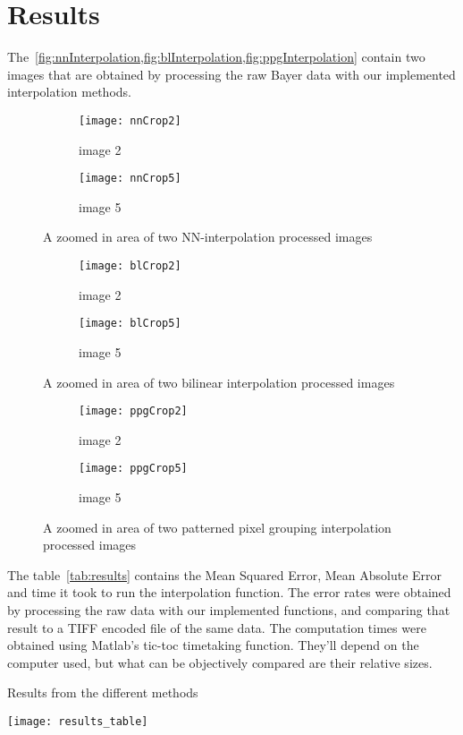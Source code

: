 \section{Results}

The~\cref{fig:nnInterpolation,fig:blInterpolation,fig:ppgInterpolation}
contain two images that are obtained by processing the raw Bayer data with our
implemented interpolation methods.

\begin{figure}[H]
\centering
\begin{subfigure}{.25\textwidth}
  \centering
  \texttt{[image: nnCrop2]}
  \caption{image 2}
\label{fig:nnCrop2}
\end{subfigure}%
\begin{subfigure}{.25\textwidth}
  \centering
  \texttt{[image: nnCrop5]}
  \caption{image 5}
\label{fig:nnCrop5}
\end{subfigure}
\caption{A zoomed in area of two NN-interpolation processed images}
\label{fig:nnInterpolation}
\end{figure}


\begin{figure}[H]
\centering
\begin{subfigure}{.25\textwidth}
  \centering
  \texttt{[image: blCrop2]}
  \caption{image 2}
\label{fig:blCrop2}
\end{subfigure}%
\begin{subfigure}{.25\textwidth}
  \centering
  \texttt{[image: blCrop5]}
  \caption{image 5}
\label{fig:blCrop5}
\end{subfigure}
\caption{A zoomed in area of two bilinear interpolation processed images}
\label{fig:blInterpolation}
\end{figure}


\begin{figure}[H]
\centering
\begin{subfigure}{.25\textwidth}
  \centering
  \texttt{[image: ppgCrop2]}
  \caption{image 2}
\label{fig:ppgCrop2}
\end{subfigure}%
\begin{subfigure}{.25\textwidth}
  \centering
  \texttt{[image: ppgCrop5]}
  \caption{image 5}
\label{fig:ppgCrop5}
\end{subfigure}
\caption{A zoomed in area of two patterned pixel grouping interpolation processed images}
\label{fig:ppgInterpolation}
\end{figure}


The table~\ref{tab:results} contains the Mean Squared Error, Mean Absolute
Error and time it took to run the interpolation function. The error rates were
obtained by processing the raw data with our implemented functions, and
comparing that result to a TIFF encoded file of the same data. The computation
times were obtained using Matlab's tic-toc timetaking function. They'll
depend on the computer used, but what can be objectively compared are their
relative sizes.
\begin{table}[H]
  \centering
  \caption{Results from the different methods}
\label{tab:results}
  \texttt{[image: results\_table]}
\end{table}


